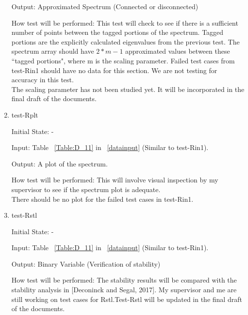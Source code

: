 \documentclass[12pt, titlepage]{article}
\begin{document}
\begin{enumerate}
Output: Approximated Spectrum (Connected or disconnected)

How test will be performed: This test will check to see if there is a 
sufficient number of points between the tagged portions of the spectrum. Tagged 
portions are the explicitly calculated eigenvalues from the previous test. The 
spectrum array should have $2*m-1$ approximated values between these ``tagged 
portions", where m is the scaling parameter. 
Failed test cases from test-Rin1 should have no data for this section. 
We are not testing for accuracy in this test.\\
 The scaling parameter has not 
been studied yet. It will be incorporated in the final draft of the documents.

\item{test-Rplt} 

Initial State: -

Input: Table ~\ref{Table:D_11} in ~\ref{datainput} (Similar to test-Rin1).

Output: A plot of the spectrum.

How test will be performed: This will involve visual inspection by my 
supervisor to see if the spectrum plot is adequate. \\
There should be no plot for the failed test cases in test-Rin1. 

\item{test-Rstl} 

Initial State: -

Input: Table ~\ref{Table:D_11} in ~\ref{datainput} (Similar to test-Rin1).

Output: Binary Variable (Verification of stability) 

How test will be performed: The stability results will be compared with the 
stability analysis in [Deconinck and Segal, 2017].  My supervisor 
and me are still working on test cases for Rstl.Test-Rstl will be updated in 
the final draft of the documents.  

\end{enumerate}

\end{document}
